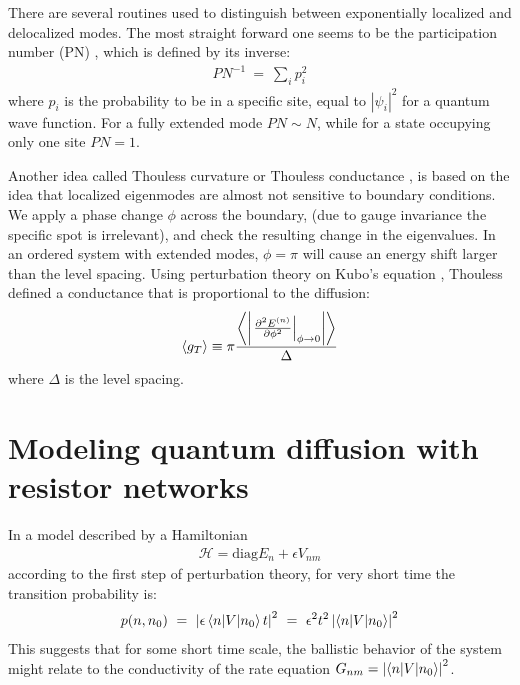 There are several routines used to distinguish between exponentially localized and delocalized modes.
The most straight forward one seems to be the participation number (PN) 
\cite{edwards_numerical_1972}, which is defined by its inverse:
%
\begin{align}
PN^{-1} \ =\ \sum_i p_i^2
\end{align}
where $p_i$ is the probability to be in a specific site, equal to $|\psi_i|^2$ 
for a quantum wave function. For a fully extended mode $PN\sim N$, while for a state
occupying only one site $PN = 1 $.


Another idea called Thouless curvature or Thouless conductance 
\cite{edwards_numerical_1972,thouless_electrons_1974,braun_level_1997}, is based
on the idea that localized eigenmodes are almost not sensitive to boundary conditions. We apply a 
phase change $\phi$ across the boundary, (due to gauge invariance the specific spot is irrelevant),
and check the resulting change in the eigenvalues. 
In an ordered system with extended modes, $\phi=\pi$ will cause an energy
shift larger than the level spacing. 
Using perturbation theory on Kubo's equation \cite{kubo_statistical-mechanical_1957},
Thouless defined a conductance that is proportional to the diffusion: 
\begin{align}\label{eq:thouless}
\left\langle g_T\right\rangle  \equiv \pi \frac{\left\langle \left|\left. \frac{\partial ^2 E^{(n)}}{\partial \phi^2}\right|_{\phi\rightarrow 0}\right|\right\rangle}{\Delta}
\end{align}
where $\Delta$ is the level spacing.




\section{Modeling quantum diffusion with resistor networks}


In a model described by a Hamiltonian 
%
\begin{align}
\mathcal{H} = \textrm{diag}{E_n} + \epsilon {V_{nm}}
\end{align}
%
according to the first step of perturbation theory,
for very short time the transition probability is:
%
\begin{align}
 p(n, n_0)\ =\ \left| \epsilon \bra n| V |n_0\ket t\right|^2 \ = \ \epsilon^2 t^2\left| \bra n| V |n_0\ket \right|^2
\end{align}
%
This suggests that for some short time scale, the ballistic behavior
of the system might relate to the conductivity of the rate equation $G_{nm} = \left| \left\langle n| V |n_0\right\rangle \right|^2$.




